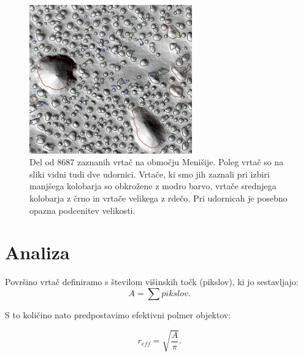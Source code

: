 \documentclass[a4paper, twoside, 12pt]{book}
\begin{document}
  \begin{figure}[h]
    \begin{center}
      \includegraphics[width=7cm]{slike/menisija-vrtace}
    \end{center}
    \caption{Del od 8687 zaznanih vrtač na območju Menišije. Poleg vrtač so na sliki vidni tudi dve udornici. Vrtače, ki smo jih zaznali pri izbiri manjšega kolobarja so obkrožene z modro barvo, vrtače srednjega kolobarja z črno in vrtače velikega z rdečo. Pri udornicah je posebno opazna podcenitev velikosti.}
    \label{fig:menisija-vrtace}
  \end{figure}

  \section{Analiza}

  Površino vrtač definiramo s številom višinskih točk (pikslov), ki jo sestavljajo:
    \begin{equation}
      A = \sum pikslov.
    \end{equation}

S to količino nato predpostavimo efektivni polmer objektov:

    \begin{equation} 
      r_{eff} = \sqrt{\frac{A}{\pi}}. 
    \end{equation}
\end{document}
